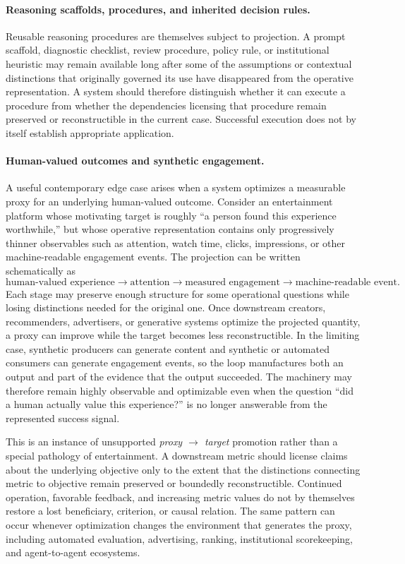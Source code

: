 \documentclass[11pt]{article}
\theoremstyle{definition}
\theoremstyle{remark}
\begin{document}
\paragraph{Reasoning scaffolds, procedures, and inherited decision rules.}
Reusable reasoning procedures are themselves subject to projection. A prompt scaffold, diagnostic checklist, review procedure, policy rule, or institutional heuristic may remain available long after some of the assumptions or contextual distinctions that originally governed its use have disappeared from the operative representation. A system should therefore distinguish whether it can execute a procedure from whether the dependencies licensing that procedure remain preserved or reconstructible in the current case. Successful execution does not by itself establish appropriate application.

\paragraph{Human-valued outcomes and synthetic engagement.}
A useful contemporary edge case arises when a system optimizes a measurable proxy for an underlying human-valued outcome. Consider an entertainment platform whose motivating target is roughly ``a person found this experience worthwhile,'' but whose operative representation contains only progressively thinner observables such as attention, watch time, clicks, impressions, or other machine-readable engagement events. The projection can be written schematically as
\[
\text{human-valued experience}
\longrightarrow
\text{attention}
\longrightarrow
\text{measured engagement}
\longrightarrow
\text{machine-readable event}.
\]
Each stage may preserve enough structure for some operational questions while losing distinctions needed for the original one. Once downstream creators, recommenders, advertisers, or generative systems optimize the projected quantity, a proxy can improve while the target becomes less reconstructible. In the limiting case, synthetic producers can generate content and synthetic or automated consumers can generate engagement events, so the loop manufactures both an output and part of the evidence that the output succeeded. The machinery may therefore remain highly observable and optimizable even when the question ``did a human actually value this experience?'' is no longer answerable from the represented success signal.

This is an instance of unsupported \emph{proxy $\rightarrow$ target} promotion rather than a special pathology of entertainment. A downstream metric should license claims about the underlying objective only to the extent that the distinctions connecting metric to objective remain preserved or boundedly reconstructible. Continued operation, favorable feedback, and increasing metric values do not by themselves restore a lost beneficiary, criterion, or causal relation. The same pattern can occur whenever optimization changes the environment that generates the proxy, including automated evaluation, advertising, ranking, institutional scorekeeping, and agent-to-agent ecosystems.\cite{Goodhart1975}
\end{document}
